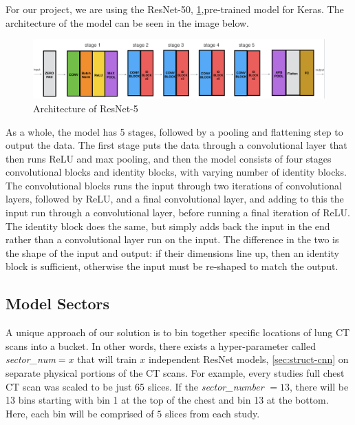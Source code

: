 \documentclass[10pt,twocolumn,letterpaper]{article}
\begin{document}
        For our project, we are using the ResNet-50, \ref{fig:struct-cnn-resnet},pre-trained model for Keras. The architecture of the model can be seen in the image below.

        \begin{figure}
            \begin{center}
                \includegraphics[width=\textwidth]{./images/Resnet-50.png}
            \end{center}
            \caption{Architecture of ResNet-5}
            \label{fig:struct-cnn-resnet}
        \end{figure}

         As a whole, the model has 5 stages, followed by a pooling and flattening step to output the data. The first
         stage puts the data through a convolutional layer that then runs ReLU and max pooling, and then the model consists
         of four stages convolutional blocks and identity blocks, with varying number of identity blocks. The convolutional
         blocks runs the input through two iterations of convolutional layers, followed by ReLU, and a final convolutional
         layer, and adding to this the input run through a convolutional layer, before running a final iteration of ReLU.
         The identity block does the same, but simply adds back the input in the end rather than a convolutional layer run
         on the input. The difference in the two is the shape of the input and output: if their dimensions line up, then an
         identity block is sufficient, otherwise the input must be re-shaped to match the output.

   \subsection{Model Sectors} \label{sec:struct-sector}

        A unique approach of our solution is to bin together specific locations of lung CT scans into a bucket. In other words, there exists
        a hyper-parameter called {\it sector\_num}$=x$ that will train $x$ independent ResNet models, \ref{sec:struct-cnn} on separate
        physical portions of the CT scans. For example, every studies full chest CT scan was scaled to be just 65 slices. If the {\it sector\_number} $=13$,
        there will be 13 bins starting with bin 1 at the top of the chest and bin 13 at the bottom. Here, each bin will be comprised
        of $5$ slices from each study.
\end{document}
